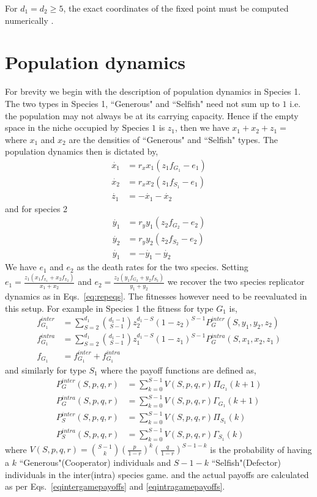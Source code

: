 \documentclass[times,onecolumn]{scrartcl}
\begin{document}
For $d_1=d_2 \geq 5$, the exact coordinates of the fixed point must be computed numerically \cite{abel:AO:1824,stewart:book:2004}.


\section{Population dynamics}

For brevity we begin with the description of population dynamics in Species 1.
The two types in Species 1, ``Generous" and ``Selfish" need not sum up to $1$ i.e. the population may not always be at its carrying capacity.
Hence if the empty space in the niche occupied by Species $1$ is $z_1$, then we have $x_1 + x_2 + z_1 = $ where $x_1$ and $x_2$ are the densities of ``Generous" and ``Selfish" types.
The population dynamics then is dictated by,
%
\begin{align}
	\dot{x_1} &= r_x x_1 (z_1 f_{G_1} - e_1) \\
	\dot{x_2} &= r_x x_2 (z_1 f_{S_1} - e_1) \\
	\dot{z_1} &= - \dot{x_1} - \dot{x_2}
\end{align}
%
and for species 2
\begin{align}
	\dot{y_1} &= r_y y_1 (z_2 f_{G_2} - e_2) \\
	\dot{y_2} &= r_y y_2 (z_2 f_{S_2} - e_2) \\
	\dot{y_1} &= - \dot{y_1} - \dot{y_2}
\end{align}
%
We have $e_1$ and $e_2$ as the death rates for the two species.
Setting $e_1 = \frac{z_1 (x_1 f_{x_1} + x_2 f_{x_2}) }{x_1 + x_2}$ and $e_2 = \frac{z_2 (y_1 f_{G_2} + y_2 f_{S_2}) }{y_1 + y_2}$ we recover the two species replicator dynamics as in Eqs.~\ref{eq:repeqs}.
The fitnesses however need to be reevaluated in this setup.
For example in Species 1 the fitness for type $G_1$ is,
%
\begin{align}
	f_{G_1}^{inter} &= \sum_{S=2}^{d_1} \binom{d_1 -1}{S-1} z_2 ^{d_1 -S} (1-z_2)^{S-1} P_G^{inter}(S,y_1,y_2,z_2) \\
	f_{G_1}^{intra} &= \sum_{S=2}^{d_1} \binom{d_1 -1}{S-1} z_1 ^{d_1 -S} (1-z_1)^{S-1} P_G^{intra}(S,x_1,x_2,z_1) \\
	f_{G_1} &= f_{G_1}^{inter} + f_{G_1}^{intra}
\end{align}
%
and similarly for type $S_1$ where the payoff functions are defined as,
%
\begin{align}
	P_G^{inter}(S,p,q,r) &= \sum_{k=0}^{S-1} V(S,p,q,r) \Pi_{G_1}(k+1) \\
	P_G^{intra}(S,p,q,r) &= \sum_{k=0}^{S-1} V(S,p,q,r) \Gamma_{G_1}(k+1) \\
	P_S^{inter}(S,p,q,r) &= \sum_{k=0}^{S-1} V(S,p,q,r) \Pi_{S_1}(k) \\
	P_S^{intra}(S,p,q,r) &= \sum_{k=0}^{S-1} V(S,p,q,r) \Gamma_{S_1}(k)
\end{align}
%
where $V(S,p,q,r) = \binom{S-1}{k} \left( \frac{p}{1-r}\right)^k  \left(\frac{q}{1-r}\right)^{S-1-k}$ is the probability of having a $k$ ``Generous"(Cooperator) individuals and $S-1-k$ ``Selfish"(Defector) individuals in the inter(intra) species game.
and the actual payoffs are calculated as per Eqs.~\ref{eqintergamepayoffs} and \ref{eqintragamepayoffs}.



\end{document}
